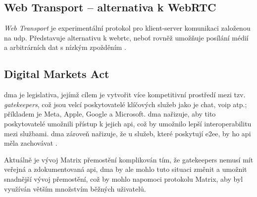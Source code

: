\subsection{Web Transport -- alternativa k WebRTC}

\textit{Web Transport} je experimentální protokol pro klient-server komunikaci
založenou na \gls{udp}. Představuje alternativu k \gls{webrtc}, neboť rovněž
umožňuje posílání médií a arbitrárních dat s nízkým zpožděním
\parencite{GitHub-WebTransport-Explainer}.

\subsection{Digital Markets Act}\label{dma}

\gls{dma} je legislativa, jejímž cílem je vytvořit více kompetitivní prostředí
mezi tzv. \textit{gatekeepers}, což jsou velcí poskytovatelé klíčových služeb
jako je chat, \gls{voip} atp.; příkladem je Meta, Apple, Google a Microsoft.
\gls{dma} nařizuje, aby tito poskytovatelé umožnili přístup k jejich \gls{api},
což by umožnilo lepší interoperabilitu mezi službami. \gls{dma} zároveň
nařizuje, že u služeb, které poskytují \gls{e2ee}, by ho \gls{api} měla
zachovávat \parencite{Element-AGuideToNavigateTheDMA}.

Aktuálně je vývoj Matrix přemostění komplikován tím, že gatekeepers nemusí mít
veřejná a zdokumentovaná \gls{api}, \gls{dma} by ale mohlo tuto situaci změnit a
umožnit snadnější vývoj přemostění, což by mohlo napomoci protokolu Matrix, aby
byl využíván větším množstvím běžných uživatelů.
